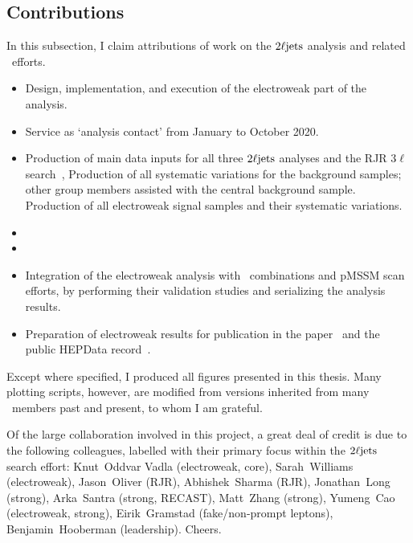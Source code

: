 \FloatBarrier
\subsection{Contributions}

In this subsection, I claim attributions of work on the $2\ell\mathrm{jets}$ analysis
and related \atlas\ efforts.

\begin{itemize}
\item Design, implementation, and execution of the electroweak part of the analysis.
\item Service as `analysis contact' from January to October 2020.
\item Production of main data inputs for all three $2\ell\mathrm{jets}$ analyses
and the RJR $3\ell$ search~\cite{atlas_rjr_3l_SUSY_2019_09},
Production of all systematic variations for the background samples;
other group members assisted with the central background sample.
Production of all electroweak signal samples and their systematic variations.
\item {}
\item {}
\item Integration of the electroweak analysis with \atlas\ combinations and
pMSSM scan efforts, by performing their validation studies and serializing the
analysis results.
\item Preparation of electroweak results for publication in the
paper~\cite{atlas2022searches} and the public HEPData
record~\cite{maguire2017hepdata}.
\end{itemize}
Except where specified, I produced all figures presented in this thesis.
Many plotting scripts, however, are modified from versions inherited from
many \atlas\ members past and present, to whom I am grateful.

Of the large collaboration involved in this project, a great deal of credit is
due to the following colleagues, labelled with their primary focus within
the $2\ell\mathrm{jets}$ search effort:
Knut~Oddvar Vadla (electroweak, core),
Sarah~Williams (electroweak),
Jason~Oliver (RJR),
Abhishek~Sharma (RJR),
Jonathan~Long (strong),
Arka~Santra (strong, RECAST),
Matt~Zhang (strong),
Yumeng~Cao (electroweak, strong),
Eirik~Gramstad (fake/non-prompt leptons),
Benjamin~Hooberman (leadership).
Cheers.

